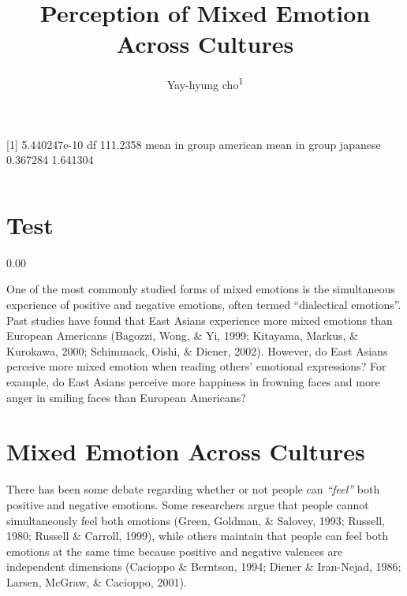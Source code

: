 \documentclass[english,man]{apa6}
\title{Perception of Mixed Emotion Across Cultures}
\author{
          Yay-hyung cho\textsuperscript{1}  }
\affiliation{
    \vspace{0.5cm}
          \textsuperscript{1} The University of Michigan  }
\begin{document}
\maketitle



{[}1{]} 5.440247e-10 df 111.2358 mean in group american mean in group
japanese 0.367284 1.641304

\begin{verbatim}
\end{verbatim}

\section{Test}\label{test}

0.00

One of the most commonly studied forms of mixed emotions is the
simultaneous experience of positive and negative emotions, often termed
\enquote{dialectical emotions}. Past studies have found that East Asians
experience more mixed emotions than European Americans (Bagozzi, Wong,
\& Yi, 1999; Kitayama, Markus, \& Kurokawa, 2000; Schimmack, Oishi, \&
Diener, 2002). However, do East Asians perceive more mixed emotion when
reading others' emotional expressions? For example, do East Asians
perceive more happiness in frowning faces and more anger in smiling
faces than European Americans?

\section{Mixed Emotion Across
Cultures}\label{mixed-emotion-across-cultures}

There has been some debate regarding whether or not people can
\emph{\enquote{feel}} both positive and negative emotions. Some
researchers argue that people cannot simultaneously feel both emotions
(Green, Goldman, \& Salovey, 1993; Russell, 1980; Russell \& Carroll,
1999), while others maintain that people can feel both emotions at the
same time because positive and negative valences are independent
dimensions (Cacioppo \& Berntson, 1994; Diener \& Iran-Nejad, 1986;
Larsen, McGraw, \& Cacioppo, 2001).
\end{document}
